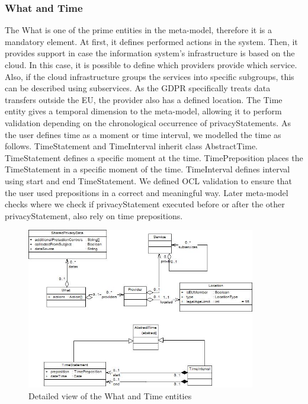 \documentclass[11pt,english]{article}
\begin{document}
\subsubsection{What and Time}
The What is one of the prime entities in the meta-model, therefore it is a mandatory element. At first, it defines performed actions in the system. Then, it provides support in case the information system's infrastructure is based on the cloud. In this case, it is possible to define which providers provide which service. Also, if the cloud infrastructure groups the services into specific subgroups, this can be described using subservices. As the GDPR specifically treats data transfers outside the EU, the provider also has a defined location. \newline The Time entity gives a temporal dimension to the meta-model, allowing it to perform validation depending on the chronological occurrence of privacyStatements. As the user defines time as a moment or time interval, we modelled the time as follows. TimeStatement and TimeInterval inherit class AbstractTime. TimeStatement defines a specific moment at the time. TimePreposition places the TimeStatement in a specific moment of the time. TimeInterval defines interval using start and end TimeStatement. We defined OCL validation to ensure that the user used prepositions in a correct and meaningful way. Later meta-model checks where we check if privacyStatement executed before or after the other privacyStatement, also rely on time prepositions.
\begin{figure}[H]
    \centering
    \includegraphics[width=10cm,scale=0.5]{images/whatAndTime.jpg}
    \caption{Detailed view of the What and Time entities}
    \label{fig:WhatAndTime}
\end{figure}
\end{document}
